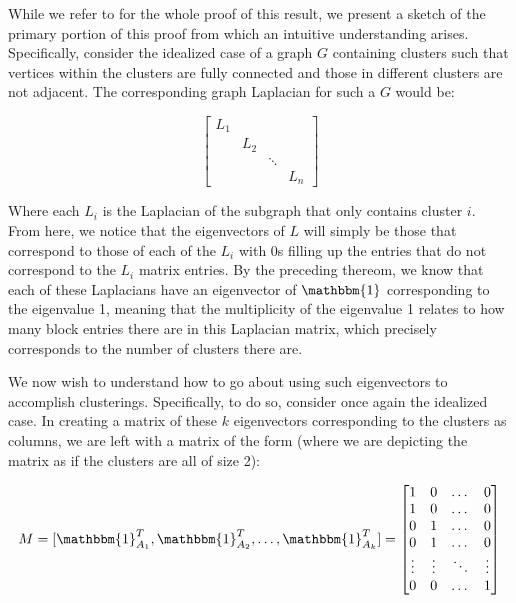 \documentclass{article}
\begin{document}
While we refer to \cite{spectral} for the whole proof of this result, we present a sketch of the primary portion of this proof from which an intuitive understanding arises. Specifically, consider the idealized case of a graph $G$ containing clusters such that vertices within the clusters are fully connected and those in different clusters are not adjacent. The corresponding graph Laplacian for such a $G$ would be:

\[
\begin{bmatrix}
    L_{1} &  & &  \\
    & L_{2} & &  \\
    & & \ddots &  \\
    & & & L_{n}
\end{bmatrix}
\]

Where each $L_i$ is the Laplacian of the subgraph that only contains cluster $i$. From here, we notice that the eigenvectors of $L$ will simply be those that correspond to those of each of the $L_i$ with 0s filling up the entries that do not correspond to the $L_i$ matrix entries. By the preceding thereom, we know that each of these Laplacians have an eigenvector of $\mathbbm{1}$ corresponding to the eigenvalue 1, meaning that the multiplicity of the eigenvalue 1 relates to how many block entries there are in this Laplacian matrix, which precisely corresponds to the number of clusters there are. 

We now wish to understand how to go about using such eigenvectors to accomplish clusterings. Specifically, to do so, consider once again the idealized case. In creating a matrix of these $k$ eigenvectors corresponding to the clusters as columns, we are left with a matrix of the form (where we are depicting the matrix as if the clusters are all of size 2):

$$ M = [\mathbbm{1}_{A_1}^T,\mathbbm{1}_{A_2}^T,\dots,\mathbbm{1}_{A_k}^T] = 
\begin{bmatrix}
    1 & 0 & \dots & 0 \\
    1 & 0 & \dots & 0 \\
    0 & 1 & \dots & 0 \\
    0 & 1 & \dots & 0 \\
    \vdots & \vdots & \ddots & \vdots \\
    0 & 0 & \dots & 1
\end{bmatrix}
$$
\end{document}
